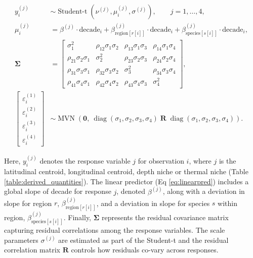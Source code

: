 \documentclass[lineno,pdflatex,sn-nature]{sn-jnl}%
\begin{document}
\begin{align}
y_{i}^{(j)} &\sim \operatorname{Student-t}\left(\nu^{(j)}, \mu_{i}^{(j)}, \sigma^{(j)}\right),\qquad j=1,\dots,4,\\
\mu_{i}^{(j)} &= \beta^{(j)} \cdot \text{decade}_{i} + \beta_{\text{region}[r[i]]}^{(j)} \cdot \text{decade}_{i} + \beta_{\text{species}[s[i]]}^{(j)} \cdot \text{decade}_{i},\label{eq:linearpred} \\
\boldsymbol{\Sigma} &=
\begin{bmatrix}
\sigma_1^2 & \rho_{12}\sigma_1\sigma_2 & \rho_{13}\sigma_1\sigma_3 & \rho_{14}\sigma_1\sigma_4 \\
\rho_{21}\sigma_2\sigma_1 & \sigma_2^2 & \rho_{23}\sigma_2\sigma_3 & \rho_{24}\sigma_2\sigma_4 \\
\rho_{31}\sigma_3\sigma_1 & \rho_{32}\sigma_3\sigma_2 & \sigma_3^2 & \rho_{34}\sigma_3\sigma_4 \\
\rho_{41}\sigma_4\sigma_1 & \rho_{42}\sigma_4\sigma_2 & \rho_{43}\sigma_4\sigma_3 & \sigma_4^2
\end{bmatrix},\\
\begin{bmatrix}
\varepsilon_i^{(1)} \\ \varepsilon_i^{(2)} \\ \varepsilon_i^{(3)} \\ \varepsilon_i^{(4)}
\end{bmatrix}
&\sim \operatorname{MVN}\!\left(
\mathbf{0},\ 
\operatorname{diag}(\sigma_1,\sigma_2,\sigma_3,\sigma_4)\;
\mathbf{R}\;
\operatorname{diag}(\sigma_1,\sigma_2,\sigma_3,\sigma_4)
\right).
\end{align}

\vspace{1em}

\noindent Here, $y^{(j)}_i$ denotes the response variable $j$ for observation $i$, where $j$ is the latitudinal centroid,
longitudinal centroid, depth niche or thermal niche (Table \ref{table:derived_quantities}). The linear predictor (Eq \ref{eq:linearpred}) includes a global slope of decade for response $j$, denoted $\beta^{(j)}$, along with a deviation in slope for region $r$, $\beta^{(j)}_{\text{region}[r[i]]}$, and a deviation in slope for species $s$ within region, $\beta^{(j)}_{\text{species}[s[i]]}$. Finally,
$\boldsymbol{\Sigma}$ represents the residual covariance matrix capturing residual correlations among the response variables. The scale parameters $\sigma^{(j)}$ are estimated as part of the Student-t and the residual correlation matrix $\mathbf{R}$ controls how residuals co-vary across responses.
\end{document}
